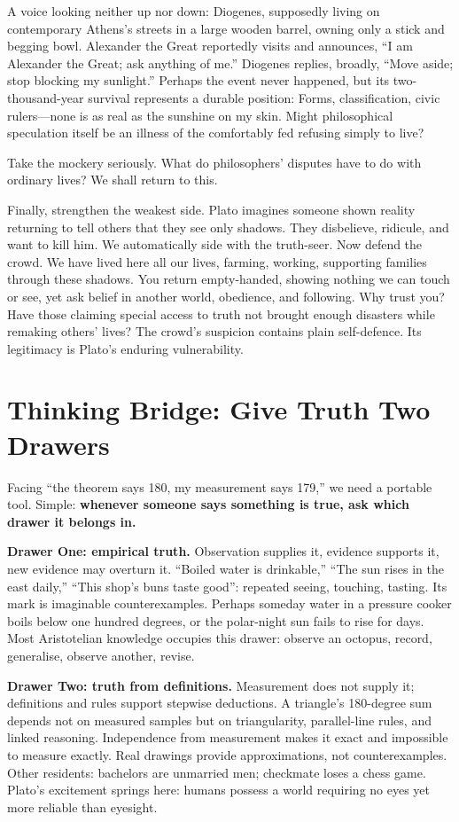 A voice looking neither up nor down: Diogenes, supposedly living on contemporary Athens's streets in a large wooden barrel, owning only a stick and begging bowl. Alexander the Great reportedly visits and announces, ``I am Alexander the Great; ask anything of me.'' Diogenes replies, broadly, ``Move aside; stop blocking my sunlight.'' Perhaps the event never happened, but its two-thousand-year survival represents a durable position: Forms, classification, civic rulers---none is as real as the sunshine on my skin. Might philosophical speculation itself be an illness of the comfortably fed refusing simply to live?

Take the mockery seriously. What do philosophers' disputes have to do with ordinary lives? We shall return to this.

Finally, strengthen the weakest side. Plato imagines someone shown reality returning to tell others that they see only shadows. They disbelieve, ridicule, and want to kill him. We automatically side with the truth-seer. Now defend the crowd. We have lived here all our lives, farming, working, supporting families through these shadows. You return empty-handed, showing nothing we can touch or see, yet ask belief in another world, obedience, and following. Why trust you? Have those claiming special access to truth not brought enough disasters while remaking others' lives? The crowd's suspicion contains plain self-defence. Its legitimacy is Plato's enduring vulnerability.

\section[Thinking Bridge: Two Drawers of Truth]{Thinking Bridge: Give Truth Two Drawers}
Facing ``the theorem says 180, my measurement says 179,'' we need a portable tool. Simple: \textbf{whenever someone says something is true, ask which drawer it belongs in.}

\textbf{Drawer One: empirical truth.} Observation supplies it, evidence supports it, new evidence may overturn it. ``Boiled water is drinkable,'' ``The sun rises in the east daily,'' ``This shop's buns taste good'': repeated seeing, touching, tasting. Its mark is imaginable counterexamples. Perhaps someday water in a pressure cooker boils below one hundred degrees, or the polar-night sun fails to rise for days. Most Aristotelian knowledge occupies this drawer: observe an octopus, record, generalise, observe another, revise.

\textbf{Drawer Two: truth from definitions.} Measurement does not supply it; definitions and rules support stepwise deductions. A triangle's 180-degree sum depends not on measured samples but on triangularity, parallel-line rules, and linked reasoning. Independence from measurement makes it exact and impossible to measure exactly. Real drawings provide approximations, not counterexamples. Other residents: bachelors are unmarried men; checkmate loses a chess game. Plato's excitement springs here: humans possess a world requiring no eyes yet more reliable than eyesight.

